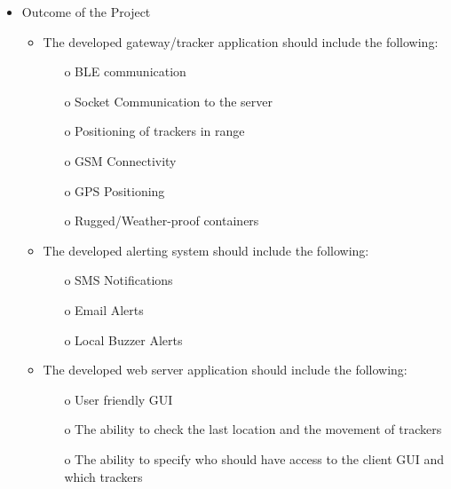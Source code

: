 \begin{itemize}
	\item Outcome of the Project
	\begin{itemize}
		\item The developed gateway/tracker application should include the following:
		\begin{itemize}
			\item[o] BLE communication
			\item[o] Socket Communication to the server
			\item[o] Positioning of trackers in range
			\item[o] GSM Connectivity
			\item[o] GPS Positioning
			\item[o] Rugged/Weather-proof containers
		\end{itemize}
		\item The developed alerting system should include the following:
		\begin{itemize}
			\item [o] SMS Notifications
			\item [o] Email Alerts
			\item [o] Local Buzzer Alerts
		\end{itemize}
		\item The developed web server application should include the following:
		\begin{itemize}
			\item [o] User friendly GUI
			\item [o] The ability to check the last location and the movement of trackers
			\item [o] The ability to specify who should have access to the client GUI and which trackers
		\end{itemize}
	\end{itemize}
	
\end{itemize}

